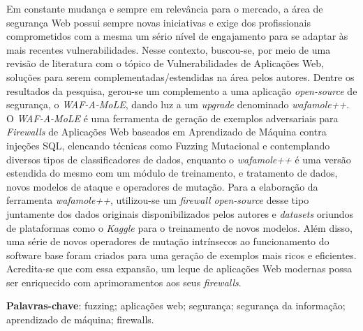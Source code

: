 \begin{resumo}
\begin{SingleSpace}
Em constante mudança e sempre em relevância para o mercado, a área de segurança Web possui sempre novas iniciativas e exige dos profissionais comprometidos com a mesma um sério nível de engajamento para se adaptar às mais recentes vulnerabilidades. Nesse contexto, buscou-se, por meio de uma revisão de literatura com o tópico de Vulnerabilidades de Aplicações Web, soluções para serem complementadas/estendidas na área pelos autores.
Dentre os resultados da pesquisa, gerou-se um complemento a uma aplicação \textit{open-source} de segurança, o \textit{WAF-A-MoLE}, dando luz a um \textit{upgrade} denominado \textit{wafamole++}. O \textit{WAF-A-MoLE} é uma ferramenta de geração de exemplos adversariais para \textit{Firewalls} de Aplicações Web baseados em Aprendizado de Máquina contra injeções SQL, elencando técnicas como Fuzzing Mutacional e contemplando diversos tipos de classificadores de dados, enquanto o \textit{wafamole++} é uma versão estendida do mesmo com um módulo de treinamento, e tratamento de dados, novos modelos de ataque e operadores de mutação. Para a elaboração da ferramenta \textit{wafamole++}, utilizou-se um \textit{firewall }\textit{open-source} desse tipo juntamente dos dados originais disponibilizados pelos autores e \textit{datasets} oriundos de plataformas como o \textit{Kaggle} para o treinamento de novos modelos. Além disso, uma série de novos operadores de mutação intrínsecos ao funcionamento do software base foram criados para uma geração de exemplos mais ricos e eficientes. Acredita-se que com essa expansão, um leque de aplicações Web modernas possa ser enriquecido com aprimoramentos aos seus \textit{firewalls}.
\end{SingleSpace}
\vspace{\onelineskip}
\textbf{Palavras-chave}: fuzzing; aplicações web; segurança; segurança da informação; aprendizado de máquina; firewalls.

\end{resumo}



